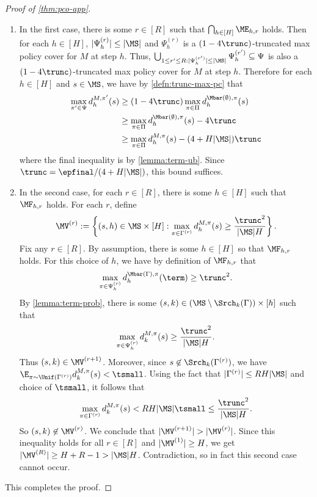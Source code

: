 \begin{proof}[Proof of \cref{thm:pco-app}]
\begin{enumerate}
\item In the first case, there is some $r \in [R]$ such that $\bigcap_{h \in [H]} \ME_{h,r}$ holds. Then for each $h \in [H]$, $|\Psi_h^{(r)}| \leq |\MS|$ and $\Psi_h^{(r)}$ is a $(1-4\trunc)$-truncated max policy cover for $M$ at step $h$. Thus, $\bigcup_{1 \leq r' \leq R: |\Psi_h^{(r')}| \leq |\MS|} \Psi_h^{(r')} \subseteq \Psi$ is also a $(1-4\trunc)$-truncated max policy cover for $M$ at step $h$. Therefore for each $h \in [H]$ and $s \in \MS$, we have by \cref{defn:trunc-max-pc} that
\begin{align*}
\max_{\pi'\in\Psi} d^{M,\pi'}_h(s)
&\geq (1-4\trunc) \max_{\pi\in\Pi} d^{\Mbar(\emptyset),\pi}_h(s) \\ 
&\geq \max_{\pi \in\Pi} d^{\Mbar(\emptyset),\pi}_h(s) - 4\trunc \\ 
&\geq \max_{\pi \in \Pi} d^{M,\pi}_h(s) - (4 + H|\MS|)\trunc
\end{align*}
where the final inequality is by \cref{lemma:term-ub}. Since $\trunc = \epfinal/(4+H|\MS|)$, this bound suffices.
\item In the second case, for each $r \in [R]$, there is some $h \in [H]$ such that $\MF_{h,r}$ holds. For each $r$, define
\[\MV^{(r)} := \left\{(s,h) \in \MS\times[H]: \max_{\pi\in\Gamma^{(r)}} d^{M,\pi}_h(s) \geq \frac{\trunc^2}{|\MS|H}\right\}.\]
Fix any $r \in [R]$. By assumption, there is some $h \in [H]$ so that $\MF_{h,r}$ holds. For this choice of $h$, we have by definition of $\MF_{h,r}$ that 
\[\max_{\pi \in \Psi_{h}^{(r)}} d^{\Mbar(\Gamma),\pi}_h(\term) \geq \trunc^2.\] 
By \cref{lemma:term-prob}, there is some $(s,k) \in (\MS\setminus \Srch_k(\Gamma))\times[h]$ such that \[\max_{\pi\in\Psi_h^{(r)}} d^{M,\pi}_k(s) \geq \frac{\trunc^2}{|\MS|H}.\] Thus $(s,k) \in \MV^{(r+1)}$. Moreover, since $s \not \in \Srch_k(\Gamma^{(r)})$, we have $\E_{\pi\sim\Unif(\Gamma^{(r)})} d^{M,\pi}_k(s) < \tsmall$. Using the fact that $|\Gamma^{(r)}| \leq RH|\MS|$ and choice of $\tsmall$, it follows that \[\max_{\pi\in\Gamma^{(r)}} d^{M,\pi}_k(s) < RH|\MS|\tsmall \leq \frac{\trunc^2}{|\MS|H}.\] So $(s,k) \not \in \MV^{(r)}$. We conclude that $|\MV^{(r+1)}| > |\MV^{(r)}|$. Since this inequality holds for all $r \in [R]$ and $|\MV^{(1)}| \geq H$, we get $|\MV^{(R)}| \geq H + R - 1 > |\MS|H$. Contradiction, so in fact this second case cannot occur.
\end{enumerate}
This completes the proof.
\end{proof}

